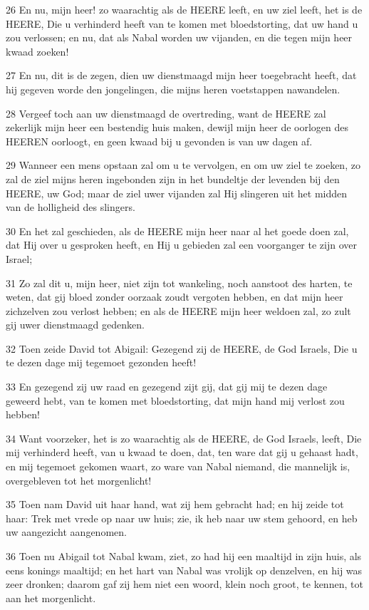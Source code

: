 \par 26 En nu, mijn heer! zo waarachtig als de HEERE leeft, en uw ziel leeft, het is de HEERE, Die u verhinderd heeft van te komen met bloedstorting, dat uw hand u zou verlossen; en nu, dat als Nabal worden uw vijanden, en die tegen mijn heer kwaad zoeken!
\par 27 En nu, dit is de zegen, dien uw dienstmaagd mijn heer toegebracht heeft, dat hij gegeven worde den jongelingen, die mijns heren voetstappen nawandelen.
\par 28 Vergeef toch aan uw dienstmaagd de overtreding, want de HEERE zal zekerlijk mijn heer een bestendig huis maken, dewijl mijn heer de oorlogen des HEEREN oorloogt, en geen kwaad bij u gevonden is van uw dagen af.
\par 29 Wanneer een mens opstaan zal om u te vervolgen, en om uw ziel te zoeken, zo zal de ziel mijns heren ingebonden zijn in het bundeltje der levenden bij den HEERE, uw God; maar de ziel uwer vijanden zal Hij slingeren uit het midden van de holligheid des slingers.
\par 30 En het zal geschieden, als de HEERE mijn heer naar al het goede doen zal, dat Hij over u gesproken heeft, en Hij u gebieden zal een voorganger te zijn over Israel;
\par 31 Zo zal dit u, mijn heer, niet zijn tot wankeling, noch aanstoot des harten, te weten, dat gij bloed zonder oorzaak zoudt vergoten hebben, en dat mijn heer zichzelven zou verlost hebben; en als de HEERE mijn heer weldoen zal, zo zult gij uwer dienstmaagd gedenken.
\par 32 Toen zeide David tot Abigail: Gezegend zij de HEERE, de God Israels, Die u te dezen dage mij tegemoet gezonden heeft!
\par 33 En gezegend zij uw raad en gezegend zijt gij, dat gij mij te dezen dage geweerd hebt, van te komen met bloedstorting, dat mijn hand mij verlost zou hebben!
\par 34 Want voorzeker, het is zo waarachtig als de HEERE, de God Israels, leeft, Die mij verhinderd heeft, van u kwaad te doen, dat, ten ware dat gij u gehaast hadt, en mij tegemoet gekomen waart, zo ware van Nabal niemand, die mannelijk is, overgebleven tot het morgenlicht!
\par 35 Toen nam David uit haar hand, wat zij hem gebracht had; en hij zeide tot haar: Trek met vrede op naar uw huis; zie, ik heb naar uw stem gehoord, en heb uw aangezicht aangenomen.
\par 36 Toen nu Abigail tot Nabal kwam, ziet, zo had hij een maaltijd in zijn huis, als eens konings maaltijd; en het hart van Nabal was vrolijk op denzelven, en hij was zeer dronken; daarom gaf zij hem niet een woord, klein noch groot, te kennen, tot aan het morgenlicht.
